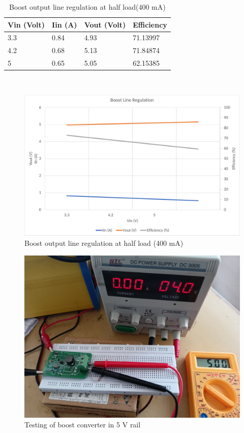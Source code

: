 \begin{table}[H]
\centering
\begin{tabular}{|l|l|l|l|}
\hline
Vin (Volt) & Iin (A) & Vout (Volt) & Efficiency \\ \hline
3.3        & 0.84    & 4.93        & 71.13997   \\ \hline
4.2        & 0.68    & 5.13        & 71.84874   \\ \hline
5          & 0.65    & 5.05        & 62.15385   \\ \hline
\end{tabular}
\caption{Boost output line regulation at half load(400 mA)}
\label{table:4}
\end{table}
\\
\begin{figure}[H]
	\centering
	\includegraphics[width=\columnwidth]{IMGS/Boost output line regulation at half load (400mA).pdf}
	\caption{Boost output line regulation at half load (400 mA)}
	\label{fig:arch}
\end{figure}
\pagebreak

\begin{figure}[H]
	\centering
	\includegraphics[width=\columnwidth]{IMGS/TestSetupPics/Boost_out.jpg}
	\caption{Testing of boost converter in 5 V rail}
	\label{fig:arch}
\end{figure}

